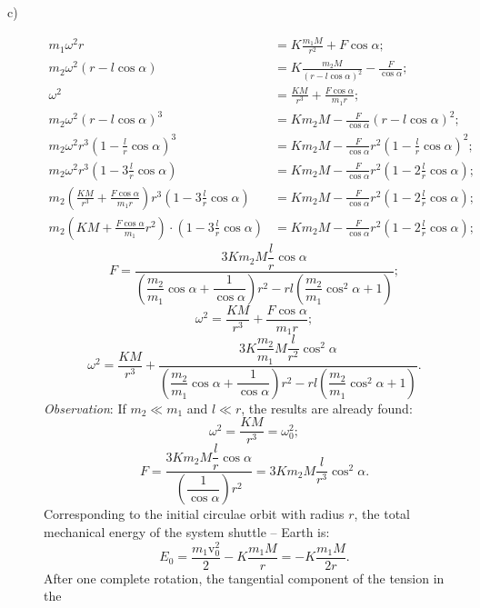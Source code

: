 \begin{description}
\item[c)]
  \begin{align*}
    m_1\omega^2r &= K\frac{m_1M}{r^2} + F\cos\alpha; \\
    m_2\omega^2\left(r - l\cos\alpha\right)
      &= K\frac{m_2M}{\left(r - l\cos\alpha\right)^2}
       - \frac{F}{\cos\alpha}; \\
    \omega^2 &= \frac{KM}{r^3} + \frac{F\cos\alpha}{m_1r}; \\
    m_2\omega^2\left(r - l\cos\alpha\right)^3
      &= Km_2M - \frac{F}{\cos\alpha}\left(r - l\cos\alpha\right)^2; \\
    m_2\omega^2r^3\left(1 - \frac{l}{r}\cos\alpha\right)^3
      &= Km_2M - \frac{F}{\cos\alpha}r^2
        \left(1 - \frac{l}{r}\cos\alpha\right)^2; \\
    m_2\omega^2r^3\left(1 - 3\frac{l}{r}\cos\alpha\right)
      &= Km_2M - \frac{F}{\cos\alpha}r^2
        \left(1 - 2\frac{l}{r}\cos\alpha\right); \\
    m_2\left(\frac{KM}{r^3} + \frac{F\cos\alpha}{m_1r}\right)
      r^3\left(1 - 3\frac{l}{r}\cos\alpha\right)
      &= Km_2M - \frac{F}{\cos\alpha}r^2
        \left(1 - 2\frac{l}{r}\cos\alpha\right); \\
    m_2\left(KM + \frac{F\cos\alpha}{m_1}r^2\right)\cdot
      \left(1 - 3\frac{l}{r}\cos\alpha\right)
      &= Km_2M - \frac{F}{\cos\alpha}r^2
        \left(1 - 2\frac{l}{r}\cos\alpha\right);
  \end{align*}
  \[
    F = \frac{3Km_2M\dfrac{l}{r}\cos\alpha}
      {\left(\dfrac{m_2}{m_1}\cos\alpha
        + \dfrac{1}{\cos\alpha}\right)r^2
        - rl\left(\dfrac{m_2}{m_1}\cos^2\alpha + 1\right)};
  \]
  \[
    \omega^2 = \frac{KM}{r^3} + \frac{F\cos\alpha}{m_1r};
  \]
  \[
    \omega^2 = \frac{KM}{r^3}
      + \frac{3K\dfrac{m_2}{m_1}M\dfrac{l}{r^2}\cos^2\alpha}
      {\left(\dfrac{m_2}{m_1}\cos\alpha
        + \dfrac{1}{\cos\alpha}\right)r^2
        - rl\left(\dfrac{m_2}{m_1}\cos^2\alpha + 1\right)}.
  \]
  \textit{Observation}: If $m_2 \ll m_1$ and $l \ll r$, the results are
  already found:
  \[
    \omega^2 = \frac{KM}{r^3} = \omega_0^2;
  \]
  \[
    F = \frac{3Km_2M\dfrac{l}{r}\cos\alpha}
      {\left(\dfrac{1}{\cos\alpha}\right)r^2}
      = 3Km_2M\frac{l}{r^3}\cos^2\alpha.
  \]
  Corresponding to the initial circulae orbit with radius $r$, the total %
  mechanical energy of the system shuttle -- Earth is:
  \[
    E_0 = \frac{m_1\mathrm{v}_0^2}{2} - K\frac{m_1M}{r} = -K\frac{m_1M}{2r}.
  \]
  After one complete rotation, the tangential component of the tension in the

\end{description}
